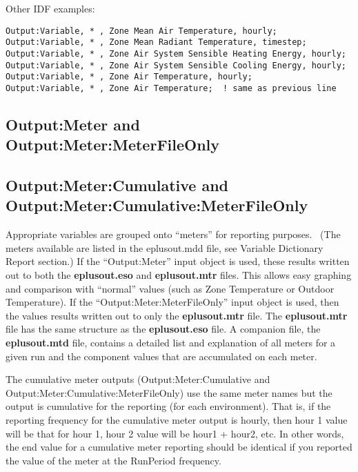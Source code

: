 Other IDF examples:

\begin{lstlisting}
Output:Variable, * , Zone Mean Air Temperature, hourly;
Output:Variable, * , Zone Mean Radiant Temperature, timestep;
Output:Variable, * , Zone Air System Sensible Heating Energy, hourly;
Output:Variable, * , Zone Air System Sensible Cooling Energy, hourly;
Output:Variable, * , Zone Air Temperature, hourly;
Output:Variable, * , Zone Air Temperature;  ! same as previous line
\end{lstlisting}

\subsection{Output:\-Meter and Output:\-Meter:\-Meter\-File\-Only}\label{outputmeter-and-outputmetermeterfileonly}

\subsection{Output:\-Meter:\-Cumulative and Output:\-Meter:\-Cumulative:\-Meter\-File\-Only}\label{outputmetercumulative-and-outputmetercumulativemeterfileonly}

Appropriate variables are grouped onto ``meters'' for reporting purposes.~ (The meters available are listed in the eplusout.mdd file, see Variable Dictionary Report section.) If the ``Output:Meter'' input object is used, these results written out to both the \textbf{eplusout.eso} and \textbf{eplusout.mtr} files. This allows easy graphing and comparison with ``normal'' values (such as Zone Temperature or Outdoor Temperature). If the ``Output:Meter:MeterFileOnly'' input object is used, then the values results written out to only the \textbf{eplusout.mtr} file. The \textbf{eplusout.mtr} file has the same structure as the \textbf{eplusout.eso} file. A companion file, the \textbf{eplusout.mtd} file, contains a detailed list and explanation of all meters for a given run and the component values that are accumulated on each meter.

The cumulative meter outputs (Output:Meter:Cumulative and Output:\-Meter:\-Cumulative:\-Meter\-File\-Only) use the same meter names but the output is cumulative for the reporting (for each environment). That is, if the reporting frequency for the cumulative meter output is hourly, then hour 1 value will be that for hour 1, hour 2 value will be hour1 + hour2, etc. In other words, the end value for a cumulative meter reporting should be identical if you reported the value of the meter at the RunPeriod frequency.

